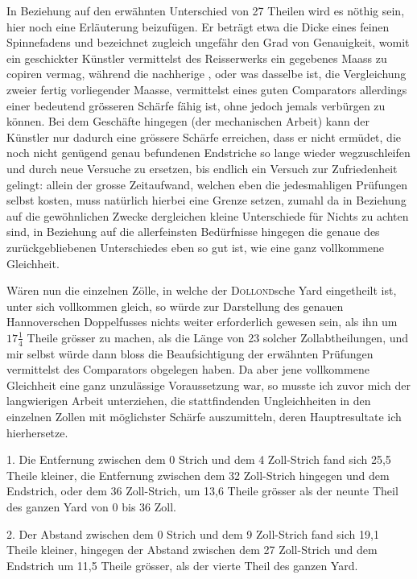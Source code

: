\clearpage{}
In Beziehung auf den erwähnten Unterschied von 27 Theilen wird es
nöthig sein, hier noch eine Erläuterung beizufügen. Er beträgt etwa die Dicke
eines feinen Spinnefadens und bezeichnet zugleich ungefähr den Grad von
Genauigkeit, womit ein geschickter Künstler vermittelst des Reisserwerks ein
gegebenes Maass zu copiren vermag, während die nachherige , oder
was dasselbe ist, die Vergleichung zweier fertig vorliegender Maasse, vermittelst
eines guten Comparators allerdings einer bedeutend grösseren Schärfe
fähig ist, ohne jedoch jemals  verbürgen zu können.
Bei dem  Geschäfte hingegen (der mechanischen Arbeit) kann der
Künstler nur dadurch eine grössere Schärfe erreichen, dass er nicht ermüdet,
die noch nicht genügend genau befundenen Endstriche so lange wieder wegzuschleifen
und durch neue Versuche zu ersetzen, bis endlich ein Versuch
zur Zufriedenheit gelingt: allein der grosse Zeitaufwand, welchen eben die
jedesmahligen Prüfungen selbst kosten, muss natürlich hierbei eine Grenze
setzen, zumahl da in Beziehung auf die gewöhnlichen Zwecke dergleichen
kleine Unterschiede für Nichts zu achten sind, in Beziehung auf die allerfeinsten
Bedürfnisse hingegen die genaue  des zurückgebliebenen
Unterschiedes eben so gut ist, wie eine ganz vollkommene Gleichheit.

Wären nun die einzelnen Zölle, in welche der \textsc{Dollond}sche Yard eingetheilt
ist, unter sich vollkommen gleich, so würde zur Darstellung des genauen
Hannoverschen Doppelfusses nichts weiter erforderlich gewesen sein, als ihn
um \(17\frac{1}{4}\) Theile grösser zu machen, als die Länge von 23 solcher Zollabtheilungen,
und mir selbst würde dann bloss die Beaufsichtigung der erwähnten
Prüfungen vermittelst des Comparators obgelegen haben. Da aber jene vollkommene
Gleichheit eine ganz unzulässige Voraussetzung war, so musste ich
zuvor mich der langwierigen Arbeit unterziehen, die stattfindenden Ungleichheiten
in den einzelnen Zollen mit möglichster Schärfe auszumitteln, deren
Hauptresultate ich hierhersetze.

1. Die Entfernung zwischen dem 0 Strich und dem 4 Zoll-Strich fand
sich 25,5 Theile kleiner, die Entfernung zwischen dem 32 Zoll-Strich hingegen
und dem Endstrich, oder dem 36 Zoll-Strich, um 13,6 Theile grösser
als der neunte Theil des ganzen Yard von 0 bis 36 Zoll.

2. Der Abstand zwischen dem 0 Strich und dem 9 Zoll-Strich fand
sich 19,1 Theile kleiner, hingegen der Abstand zwischen dem 27 Zoll-Strich
\clearpage{}
\noindent und dem Endstrich um 11,5 Theile grösser, als der vierte Theil des ganzen
Yard.

